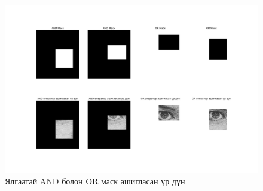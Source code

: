 \documentclass[a4paper]{article}
\begin{document}
\begin{figure}[H]
  \centering
  \includegraphics[scale = 0.30]{enhancement_arithmetics_2.png}
  \caption[Intensity 1]{Ялгаатай AND болон OR маск ашигласан үр дүн}
\end{figure}
\end{document}
